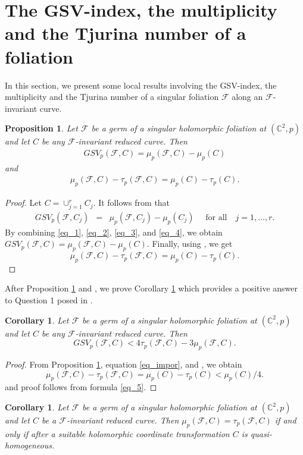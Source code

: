 \documentclass[11pt]{amsart}
\newcommand{\C}{\mathbb{C}}
\newcommand{\F}{\mathcal{F}}
\newtheorem{proposition}[theorem]{Proposition}
\newtheorem{corollary}[theorem]{Corollary}
\begin{document}
\section{The GSV-index, the multiplicity and the Tjurina number of a foliation}\label{gsv_mul}
\par In this section, we present some local results involving  the GSV-index, the multiplici\-ty and the Tjurina number of a singular foliation $\F$ along an $\F$-invariant curve.
\begin{proposition}\label{prop_1}
Let $\F$ be a germ of a singular holomorphic foliation at $(\C^2,p)$ and let $C$ be any $\F$-invariant reduced curve. Then 
\begin{eqnarray}\label{eq_5}
GSV_p(\F,C)=\mu_p(\F,C)-\mu_p(C)
\end{eqnarray}
and 
\begin{eqnarray}\label{eq_impor}
\mu_p(\F,C)-\tau_p(\F,C)=\mu_p(C)-\tau_p(C).
\end{eqnarray}
\end{proposition}
\begin{proof}
Let $C=\cup_{j=1}^{r}C_j$. It follows from \cite[Eq. 5]{FP-GB-SM2024} that 
\begin{eqnarray}\label{eq_1}
GSV_p(\F,C_j)&=&\mu_p(\F,C_j)-\mu_p(C_j)\quad\text{ for all}\quad j=1,\ldots, r.
\end{eqnarray}
By combining \eqref{eq_1}, \eqref{eq_2}, \eqref{eq_3}, and \eqref{eq_4}, we obtain
$GSV_p(\F,C)=\mu_p(\F,C)-\mu_p(C)$. 
Finally, using \cite[Proposition 6.2]{FP-GB-SM2021}, we get
\[\mu_p(\F,C)-\tau_p(\F,C)=\mu_p(C)-\tau_p(C).\]
\end{proof}
After Proposition \ref{prop_1} and \cite[Theorem 3.2]{Almiron}, we prove Corollary \ref{coro-q} which provides a positive answer to Question 1 posed in \cite{FP-GB-SM2024}.
\begin{corollary}\label{coro-q}
Let $\F$ be a germ of a singular holomorphic foliation at $(\C^2,p)$ and let $C$ be any $\F$-invariant reduced curve. Then
\[GSV_p(\F,C)<4\tau_p(\F,C)-3\mu_p(\F,C).\]
\end{corollary} 
\begin{proof}
From Proposition \ref{prop_1}, equation \eqref{eq_impor}, and \cite[Theorem 3.2]{Almiron}, we obtain
\begin{equation*}\label{eq_r}
\mu_p(\F,C)-\tau_p(\F,C)=\mu_p(C)-\tau_p(C)<\mu_p(C)/4.
\end{equation*}
and proof follows from formula \eqref{eq_5}.
\end{proof}
\begin{corollary}
 Let $\F$ be a germ of a singular holomorphic foliation at $(\C^2,p)$ and let $C$ be a $\F$-invariant reduced curve. Then $\mu_p(\F,C)=\tau_p(\F,C)$   if and only if  after a suitable holomorphic
coordinate transformation $C$ is quasi-homogeneous.
\end{corollary}
\end{document}
